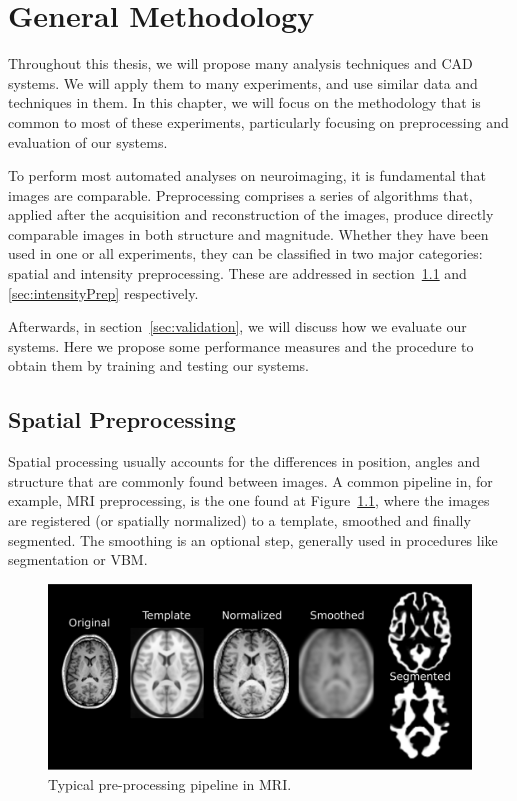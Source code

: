 \chapter{General Methodology}\label{ch:preprocessing} %
Throughout this thesis, we will propose many analysis techniques and \ac{CAD} systems. We will apply them to many experiments, and use similar data and techniques in them. In this chapter, we will focus on the methodology that is common to most of these experiments, particularly focusing on preprocessing and evaluation of our systems. 

To perform most automated analyses on neuroimaging, it is fundamental that images are comparable. Preprocessing comprises a series of algorithms that, applied after the acquisition and reconstruction of the images, produce directly comparable images in both structure and magnitude. Whether they have been used in one or all experiments, they can be classified in two major categories: spatial and intensity preprocessing. These are addressed in section~\ref{sec:spatial} and \ref{sec:intensityPrep} respectively. 

Afterwards, in section~\ref{sec:validation}, we will discuss how we evaluate our systems. Here we propose some performance measures and the procedure to obtain them by training and testing our systems.  


\section{Spatial Preprocessing}\label{sec:spatial}
Spatial processing usually accounts for the differences in position, angles and structure that are commonly found between images. A common pipeline in, for example, \ac{MRI} preprocessing, is the one found at Figure~\ref{fig:examplePreMRI}, where the images are registered (or spatially normalized) to a template, smoothed and finally segmented. The smoothing is an optional step, generally used in procedures like segmentation or \ac{VBM}. 

\begin{figure}[htp]
	\myfloatalign
	\includegraphics[width=.7\linewidth]{Graphics/ch3/preProcessPL}
	\caption[Typical pre-processing pipeline in \acs{MRI}]{Typical pre-processing pipeline in \ac{MRI}.}\label{fig:examplePreMRI}
\end{figure}

